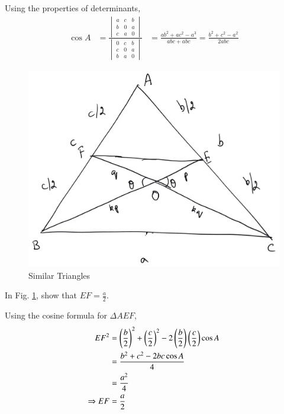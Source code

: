 %
Using the properties of determinants,
%
\begin{align}
\cos A &= \frac{
\begin{vmatrix}
a & c & b \\
b & 0 & a \\
c & a & 0
\end{vmatrix}
	}
	{
\begin{vmatrix}
0 & c & b \\
c & 0 & a \\
b & a & 0
\end{vmatrix}
	}
	&=\frac{ab^2 + ac^2 - a^3}{abc + abc} = \frac{b^2 + c^2 - a^2}{2abc}
\end{align}
%
%
\begin{figure}[!h]
	\begin{center}
		
		\includegraphics[width=\columnwidth]{./figs/ch2_median_ratio_val}
		\vspace*{-10cm}
	\end{center}
	\caption{Similar Triangles}
	\label{ch2_sim_triang}	
\end{figure}
%
\newpage
\begin{problem}
	In Fig. \ref{ch2_sim_triang}, show that $EF = \frac{a}{2}$.  
\end{problem}
\proof Using the cosine formula for $\Delta AEF$,
%
\begin{align}
EF^2 &= \left(\frac{b}{2}\right)^2 + \left(\frac{c}{2}\right)^2 - 2 \left(\frac{b}{2}\right)\left(\frac{c}{2}\right) \cos A \\
&= \frac{b^2 + c^2 - 2bc \cos A}{4} \\
&= \frac{a^2}{4} \\
\Rightarrow EF &= \frac{a}{2}
\end{align}
